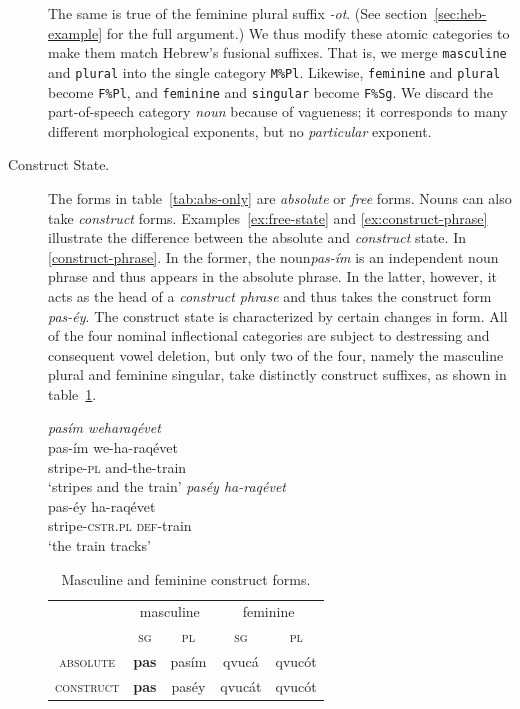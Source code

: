 \begin{description}
 The same is true 
of the feminine plural suffix \textit{-ot}. (See section~\ref{sec:heb-example} for the full argument.)
We thus modify these atomic categories to make them match 
Hebrew's fusional suffixes. That is, we merge \texttt{masculine} 
and \texttt{plural} into the single category \texttt{M\%Pl}. Likewise, 
\texttt{feminine} and \texttt{plural} become \texttt{F\%Pl}, and \texttt{feminine} 
and \texttt{singular} become \texttt{F\%Sg}.
We discard the part-of-speech category \emph{noun} because of vagueness; it corresponds to many different morphological exponents, but no \emph{particular} exponent.

\item[Construct State.]
The forms in table~\ref{tab:abs-only} are \emph{absolute} or \emph{free} forms. Nouns can also take \emph{construct} forms. Examples~\ref{ex:free-state} and \ref{ex:construct-phrase} illustrate the difference between the absolute and \emph{construct} state. In \ref{construct-phrase}. In the former, the noun\textit{pas-\'{i}m} is an independent noun phrase and thus appears in the absolute phrase. In the latter, however, it acts as the head of a \emph{construct phrase} and thus takes the construct form \emph{pas-\'{e}y}. The construct state is characterized by certain changes in form. All of the four nominal inflectional categories are subject to destressing and consequent vowel deletion, but only two of the four, namely the masculine plural and feminine singular, take distinctly construct suffixes, as shown in table~\ref{tab:cstr-endings}. 

\begin{exe}
\label{ex:abs-v-cstr}
\ex \textit{pas\'{i}m \quad weharaq\'{e}vet} \\ \label{ex:free-state}
pas-\'{i}m \quad we-ha-raq\'{e}vet \\
stripe-\textsc{pl} \quad and-the-train \\
`stripes and the train'
\ex \textit{pas\'{e}y \quad ha-raq\'{e}vet} \\ \label{ex:construct-phrase}
pas-\'{e}y \quad ha-raq\'{e}vet \\
stripe-\textsc{cstr.pl} \quad \textsc{def}-train \\
`the train tracks'
\end{exe}

   \begin{table}[h!]
      \small
      \centering
      \setlength{\extrarowheight}{8pt}
      \begin{tabular}{ccccc} 
 \toprule
 &  \multicolumn{2}{c}{masculine} & \multicolumn{2}{c}{feminine} \\
 &  \textsc{sg} & \textsc{pl} & \textsc{sg} & \textsc{pl} \\
 \cmidrule(lr){2-3} \cmidrule(lr){4-5}
   \textsc{absolute} & \textbf{pas} & pas\'{i}m  & qvuc\'{a}	& qvuc\'{o}t \\
     \textsc{construct} &\textbf{pas} & pas\'{e}y& qvuc\'{a}t	& qvuc\'{o}t\\
    \bottomrule
    \end{tabular}
    \label{tab:cstr-endings}
    \caption{Masculine and feminine construct forms.}
    \end{table}
    

\end{description}
